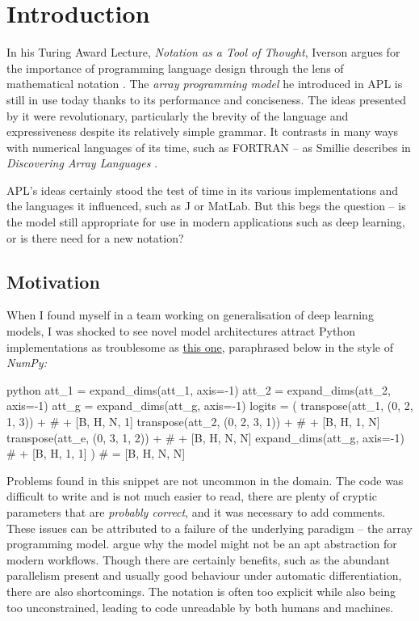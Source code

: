 \chapter{Introduction}

In his Turing Award Lecture, \textit{Notation as a Tool of Thought}, Iverson argues for the importance of programming language design through the lens of mathematical notation  \cite{iverson2007notation}. The \textit{array programming model} he introduced in APL is still in use today thanks to its performance and conciseness. The ideas presented by it were revolutionary, particularly the brevity of the language and expressiveness despite its relatively simple grammar. It contrasts in many ways with numerical languages of its time, such as FORTRAN -- as Smillie describes in \textit{Discovering Array Languages} \cite{smillie2000lecture}. 

APL's ideas certainly stood the test of time in its various implementations and the languages it influenced, such as J or MatLab. But this begs the question -- is the model still appropriate for use in modern applications such as deep learning, or is there need for a new notation?

\section{Motivation}

When I found myself in a team working on generalisation of deep learning models, I was shocked to see novel model architectures attract Python implementations as troublesome as \href{https://github.com/google-deepmind/clrs/blob/8697f51663bd77548f4b3108816c84d163883361/clrs/_src/processors.py#L140}{this one}, paraphrased below in the style of \textit{NumPy:}
\begin{center}
\begin{cminted}{python}
att_1 = expand_dims(att_1, axis=-1)
att_2 = expand_dims(att_2, axis=-1)
att_g = expand_dims(att_g, axis=-1)
logits = (
    transpose(att_1, (0, 2, 1, 3)) +  # + [B, H, N, 1]
    transpose(att_2, (0, 2, 3, 1)) +  # + [B, H, 1, N]
    transpose(att_e, (0, 3, 1, 2)) +  # + [B, H, N, N]
    expand_dims(att_g, axis=-1)       # + [B, H, 1, 1]
)                                     # = [B, H, N, N]
\end{cminted}
\end{center}
Problems found in this snippet are not uncommon in the domain. The code was difficult to write and is not much easier to read, there are plenty of cryptic parameters that are \textit{probably correct}, and it was necessary to add comments. These issues can be attributed to a failure of the underlying paradigm -- the array programming model. \textcite{paszke2021getting} argue why the model might not be an apt abstraction for modern workflows. Though there are certainly benefits, such as the abundant parallelism present and usually good behaviour under automatic differentiation, there are also shortcomings. The notation is often too explicit while also being too unconstrained, leading to code unreadable by both humans and machines. 

